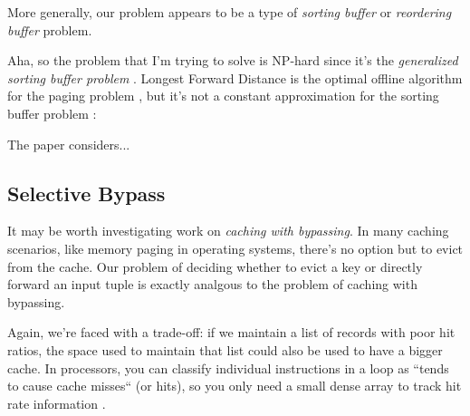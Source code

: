 \documentclass[12pt]{article}
\begin{document}
More generally, our problem appears to be a type of \emph{sorting buffer} or \emph{reordering buffer} problem.

Aha, so the problem that I'm trying to solve is NP-hard since it's the \emph{generalized sorting buffer problem} \cite{sorting-buffer-np-hardness}.
Longest Forward Distance is the optimal offline algorithm for the paging problem \cite{lfd}, but it's not a constant approximation for the sorting buffer problem \cite{sorting-buffer-np-hardness}:

The paper \cite{competitive-reordering-algorithm} considers...



\subsection{Selective Bypass}
It may be worth investigating work on \emph{caching with bypassing}.  In many caching scenarios, like memory paging in operating systems, there's no option but to evict from the cache.  Our problem of deciding whether to evict a key or directly forward an input tuple is exactly analgous to the problem of caching with bypassing.

Again, we're faced with a trade-off: if we maintain a list of records with poor hit ratios, the space used to maintain that list could also be used to have a bigger cache.  In processors, you can classify individual instructions in a loop as ``tends to cause cache misses`` (or hits), so you only need a small dense array to track hit rate information \cite{automatic-cache-bypass}.






\end{document}
